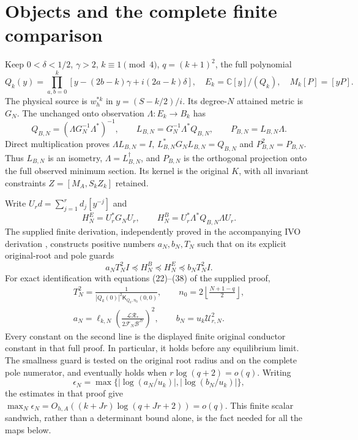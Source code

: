 \documentclass[11pt]{article}
\begin{document}
\section{Objects and the complete finite comparison}
Keep $0<\delta<1/2$, $\gamma>2$, $k\equiv1\pmod4$,
$q=(k+1)^2$, the full polynomial
\[
Q_k(y)=\prod_{a,b=0}^{k}
[y-(2b-k)\gamma+i(2a-k)\delta],
\quad E_k=\mathbb C[y]/(Q_k),
\quad M_k[P]=[yP].
\]
The physical source is $w_h^{*k}$ in $y=(S-k/2)/i$.
Its degree-$N$ attained metric is $G_N$.
The unchanged onto observation $\Lambda:E_k\to B_k$ has
\[
Q_{B,N}=(\Lambda G_N^{-1}\Lambda^*)^{-1},\qquad
L_{B,N}=G_N^{-1}\Lambda^*Q_{B,N},\qquad
P_{B,N}=L_{B,N}\Lambda.
\tag{IFH1}
\]
Direct multiplication proves $\Lambda L_{B,N}=I$,
$L_{B,N}^*G_NL_{B,N}=Q_{B,N}$ and $P_{B,N}^2=P_{B,N}$.
Thus $L_{B,N}$ is an isometry, $\Lambda=L_{B,N}^\dagger$,
and $P_{B,N}$ is the orthogonal projection onto the full observed
minimum section. Its kernel is the original $K$, with all invariant
constraints $Z=[M_A,S_kZ_k]$ retained.

Write $U_rd=\sum_{j=1}^rd_j[y^{-j}]$ and
\[
H^E_N=U_r^*G_NU_r,\qquad
H^B_N=U_r^*\Lambda^*Q_{B,N}\Lambda U_r.
\]
The supplied finite derivation, independently proved in the accompanying
IVO derivation \cite{IVO}, constructs positive numbers $a_N,b_N,T_N$
such that on its explicit original-root and pole guards
\[
a_N T_N^2I\preceq H^B_N\preceq H^E_N
\preceq b_N T_N^2I .
\tag{IFH2}
\]
For exact identification with equations (22)--(38) of the supplied proof,
\[
\begin{gathered}
T_N^2=\frac1{|Q_k(0)|^2\mathsf K_{Q_k,n_0}(0,0)},\qquad
n_0=2\left\lfloor\frac{N+1-q}{2}\right\rfloor,\\
a_N=\ell_{k,N}
 \left(\frac{\mathcal L\mathcal R_*}
 {2\mathcal F_N\mathcal B^{Jr}}\right)^2,\qquad
b_N=u_k\mathcal U_{r,N}^2 .
\end{gathered}\tag{IFH3}
\]
Every constant on the second line is the displayed finite original
conductor constant in that full proof. In particular, it holds before
any equilibrium limit. The smallness guard is tested on the original
root radius and on the complete pole numerator, and eventually holds
when $r\log(q+2)=o(q)$.
Writing
\[
\epsilon_N=\max\{|\log(a_N/u_k)|,|\log(b_N/u_k)|\},
\]
the estimates in that proof give
$\max_N\epsilon_N=O_{h,A}((k+Jr)\log(q+Jr+2))=o(q)$.
This finite scalar sandwich, rather than a determinant bound alone,
is the fact needed for all the maps below.
\end{document}
